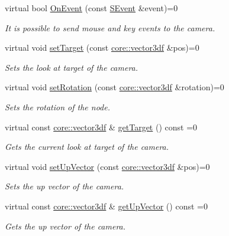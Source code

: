 \begin{DoxyCompactItemize}
virtual bool \hyperlink{classirr_1_1scene_1_1ICameraSceneNode_af27145518f43a17f803cdea086f68f3c}{On\+Event} (const \hyperlink{structirr_1_1SEvent}{S\+Event} \&event)=0
\begin{DoxyCompactList}\small\item\em It is possible to send mouse and key events to the camera. \end{DoxyCompactList}\item 
virtual void \hyperlink{classirr_1_1scene_1_1ICameraSceneNode_a7280b07fd7915c64350db5a132b4ba07}{set\+Target} (const \hyperlink{namespaceirr_1_1core_ae6e2b2a6c552833ebbd5b7463d03586b}{core\+::vector3df} \&pos)=0
\begin{DoxyCompactList}\small\item\em Sets the look at target of the camera. \end{DoxyCompactList}\item 
virtual void \hyperlink{classirr_1_1scene_1_1ICameraSceneNode_af95d5f50c192f212e11f3f050e92a470}{set\+Rotation} (const \hyperlink{namespaceirr_1_1core_ae6e2b2a6c552833ebbd5b7463d03586b}{core\+::vector3df} \&rotation)=0
\begin{DoxyCompactList}\small\item\em Sets the rotation of the node. \end{DoxyCompactList}\item 
virtual const \hyperlink{namespaceirr_1_1core_ae6e2b2a6c552833ebbd5b7463d03586b}{core\+::vector3df} \& \hyperlink{classirr_1_1scene_1_1ICameraSceneNode_a3ce50433986650eea15b20e4ed19c952}{get\+Target} () const =0
\begin{DoxyCompactList}\small\item\em Gets the current look at target of the camera. \end{DoxyCompactList}\item 
virtual void \hyperlink{classirr_1_1scene_1_1ICameraSceneNode_a1e74c17d89979fde4738276ccdcc0d3a}{set\+Up\+Vector} (const \hyperlink{namespaceirr_1_1core_ae6e2b2a6c552833ebbd5b7463d03586b}{core\+::vector3df} \&pos)=0
\begin{DoxyCompactList}\small\item\em Sets the up vector of the camera. \end{DoxyCompactList}\item 
virtual const \hyperlink{namespaceirr_1_1core_ae6e2b2a6c552833ebbd5b7463d03586b}{core\+::vector3df} \& \hyperlink{classirr_1_1scene_1_1ICameraSceneNode_a0dfb97859302021b9a44f2ead59fa230}{get\+Up\+Vector} () const =0
\begin{DoxyCompactList}\small\item\em Gets the up vector of the camera. \end{DoxyCompactList}\item 

\end{DoxyCompactItemize}
